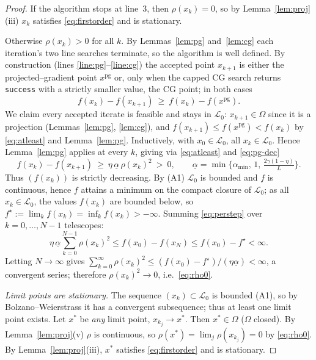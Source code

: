 \documentclass[12pt]{article}
\begin{document}
\begin{proof}
If the algorithm stops at line~3, then $\rho(x_k)=0$, so by
Lemma~\ref{lem:proj}(iii) $x_k$ satisfies \eqref{eq:firstorder} and is
stationary.

Otherwise $\rho(x_k)>0$ for all $k$. By Lemmas~\ref{lem:pg} and~\ref{lem:cg}
each iteration's two line searches terminate, so the algorithm is well defined.
By construction (lines \ref{line:pg}--\ref{line:cg}) the accepted point
$x_{k+1}$ is either the projected--gradient point $x^{\mathrm{pg}}$ or, only when
the capped CG search returns \texttt{success} with a strictly smaller value, the
CG point; in both cases
\begin{equation}\label{eq:atleast}
f(x_k)-f(x_{k+1})\ \ge\ f(x_k)-f(x^{\mathrm{pg}}).
\end{equation}
We claim every accepted iterate is feasible and stays in $\mathcal L_0$:
$x_{k+1}\in\Omega$ since it is a projection (Lemmas~\ref{lem:pg},
\ref{lem:cg}), and $f(x_{k+1})\le f(x^{\mathrm{pg}})<f(x_k)$ by
\eqref{eq:atleast} and Lemma~\ref{lem:pg}. Inductively, with
$x_0\in\mathcal L_0$, all $x_k\in\mathcal L_0$. Hence Lemma~\ref{lem:pg} applies
at every $k$, giving via \eqref{eq:atleast} and \eqref{eq:pg-dec}
\begin{equation}\label{eq:perstep}
f(x_k)-f(x_{k+1})\ \ge\ \eta\,\underline\alpha\,\rho(x_k)^2\ >\ 0,\qquad
\underline\alpha=\min\Big\{\alpha_{\min},\,1,\,\tfrac{2\gamma(1-\eta)}{L}\Big\}.
\end{equation}
Thus $(f(x_k))$ is strictly decreasing. By (A1) $\mathcal L_0$ is bounded and
$f$ is continuous, hence $f$ attains a minimum on the compact closure of
$\mathcal L_0$; as all $x_k\in\mathcal L_0$, the values $f(x_k)$ are bounded
below, so $f^\star:=\lim_k f(x_k)=\inf_k f(x_k)>-\infty$. Summing
\eqref{eq:perstep} over $k=0,\dots,N-1$ telescopes:
\[
\eta\,\underline\alpha\sum_{k=0}^{N-1}\rho(x_k)^2\le f(x_0)-f(x_N)\le f(x_0)-f^\star<\infty .
\]
Letting $N\to\infty$ gives
$\sum_{k=0}^\infty\rho(x_k)^2\le(f(x_0)-f^\star)/(\eta\underline\alpha)<\infty$,
a convergent series; therefore $\rho(x_k)^2\to0$, i.e.\ \eqref{eq:rho0}.

\emph{Limit points are stationary.} The sequence $(x_k)\subset\mathcal L_0$ is
bounded (A1), so by Bolzano--Weierstrass it has a convergent subsequence; thus
at least one limit point exists. Let $x^*$ be \emph{any} limit point,
$x_{k_j}\to x^*$. Then $x^*\in\Omega$ ($\Omega$ closed). By
Lemma~\ref{lem:proj}(v) $\rho$ is continuous, so
$\rho(x^*)=\lim_j\rho(x_{k_j})=0$ by \eqref{eq:rho0}. By
Lemma~\ref{lem:proj}(iii), $x^*$ satisfies \eqref{eq:firstorder} and is
stationary.
\end{proof}
\end{document}
